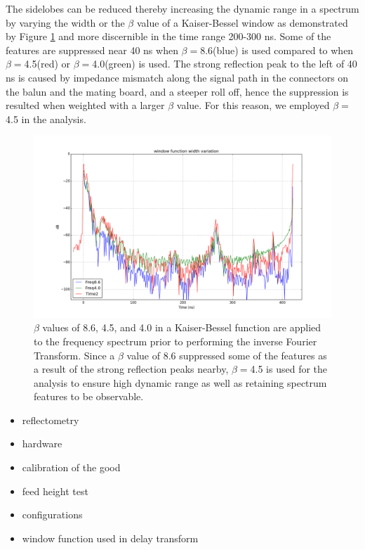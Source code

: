 \documentclass[preprint]{aastex}  %
\begin{document}
\clearpage
The sidelobes can be reduced thereby increasing the dynamic range in a spectrum by varying the width or the $\beta$ value of a Kaiser-Bessel window as demonstrated by Figure \ref{Fig:windowwidth} and more discernible in the time range 200-300 ns. Some of the features are suppressed near 40 ns when $\beta = $8.6(blue) is used compared to when $\beta = $4.5(red) or $\beta = $4.0(green) is used. The strong reflection peak to the left of 40 ns is caused by impedance mismatch along the signal path in the connectors on the balun and the mating board, and a steeper roll off, hence the suppression is resulted when weighted with a larger $\beta$ value. For this reason, we employed $\beta = $4.5 in the analysis.

\begin{figure}[H]
	\begin{center}
	\includegraphics[width =.8\textwidth]{./reflectometry_plots/window_width_variation}
	\caption{$\beta$ values of 8.6, 4.5, and 4.0 in a Kaiser-Bessel function are applied to the frequency spectrum prior to performing the inverse Fourier Transform. Since a $\beta$ value of 8.6 suppressed some of the features as a result of the strong reflection peaks nearby, $\beta = $4.5 is used for the analysis to ensure high dynamic range as well as retaining spectrum features to be observable.
\label{Fig:windowwidth}}
	\end{center}
\end{figure}
\clearpage
\begin{itemize}
\item reflectometry 
\item hardware 
\item calibration of the good
\item feed height test
\item configurations
\item window function used in delay transform
\end{itemize}
\end{document}
